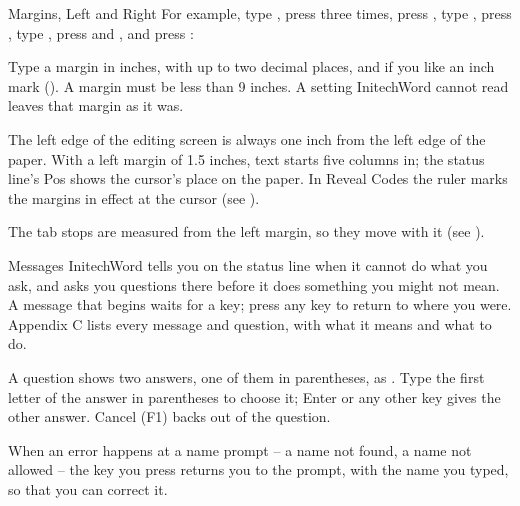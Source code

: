\begin{Feature}{Margins, Left and Right}
For example, type , press  three
times, press , type
, press , type , press
 and , and press
:
\EndReplay

Type a margin in inches, with up to two decimal places, and if you like an
inch mark ().  A margin must be less than 9 inches.  A setting
InitechWord cannot read leaves that margin as it was.

The left edge of the editing screen is always one inch from the left edge
of the paper.  With a left margin of 1.5 inches, text starts five columns in;
the status line's Pos shows the cursor's place on the paper.  In Reveal
Codes the ruler marks the margins in effect at the cursor (see ).

The tab stops are measured from the left margin, so they move with it (see
).

\end{Feature}

\begin{Feature}{Messages}
InitechWord tells you on the status line when it cannot do what you ask,
and asks you questions there before it does something you might not mean.
A message that begins  waits for a key; press any key to return
to where you were.  Appendix C lists every message and question, with what
it means and what to do.

\Notes
{}
A question shows two answers, one of them in parentheses, as
.  Type the first letter of the answer in parentheses
to choose it; Enter or any other key gives the other answer.  Cancel (F1)
backs out of the question.

When an error happens at a name prompt -- a name not found, a name not
allowed -- the key you press returns you to the prompt, with the name you
typed, so that you can correct it.

\end{Feature}

